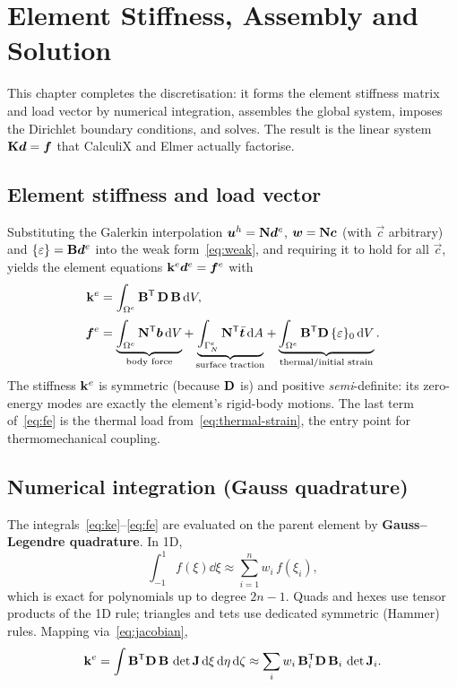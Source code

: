 \chapter{Element Stiffness, Assembly and Solution}
\label{ch:elements-assembly}

This chapter completes the discretisation: it forms the element stiffness
matrix and load vector by numerical integration, assembles the global
system, imposes the Dirichlet boundary conditions, and solves. The result
is the linear system $\mathbf{K}\bm{d}=\bm{f}$ that CalculiX and Elmer actually
factorise.

\section{Element stiffness and load vector}

Substituting the Galerkin interpolation $\bm{u}^h=\mathbf{N}\bm{d}^{e}$,
$\bm{w}=\mathbf{N}\bm{c}$ (with $\vec c$ arbitrary) and $\{\varepsilon\}=\mathbf{B}\bm{d}^{e}$ into
the weak form~\eqref{eq:weak}, and requiring it to hold for all $\vec c$,
yields the element equations $\mathbf{k}^{e}\bm{d}^{e}=\bm{f}^e$ with
\begin{align}
  \mathbf{k}^{e} &= \int_{\Omega^e}\mathbf{B}^{\mathsf{T}}\,\mathbf{D}\,\mathbf{B}\,\mathrm{d} V,
  \label{eq:ke}\\[2pt]
  \bm{f}^e &= \underbrace{\int_{\Omega^e}\mathbf{N}^{\mathsf{T}}\bm{b}\,\mathrm{d} V}_{\text{body force}}
   + \underbrace{\int_{\Gamma^e_N}\mathbf{N}^{\mathsf{T}}\bar{\bm{t}}\,\mathrm{d} A}_{\text{surface traction}}
   + \underbrace{\int_{\Omega^e}\mathbf{B}^{\mathsf{T}}\mathbf{D}\,\{\varepsilon\}_0\,\mathrm{d} V}_{\text{thermal/initial strain}} .
  \label{eq:fe}
\end{align}
The stiffness $\mathbf{k}^{e}$ is symmetric (because $\mathbf{D}$ is) and positive
\emph{semi}-definite: its zero-energy modes are exactly the element's
rigid-body motions. The last term of~\eqref{eq:fe} is the thermal load
from~\eqref{eq:thermal-strain}, the entry point for thermomechanical
coupling.

\section{Numerical integration (Gauss quadrature)}

The integrals~\eqref{eq:ke}--\eqref{eq:fe} are evaluated on the parent
element by \textbf{Gauss--Legendre quadrature}. In 1D,
\begin{equation}
  \int_{-1}^{1} f(\xi)\dd\xi \approx \sum_{i=1}^{n} w_i\,f(\xi_i),
\end{equation}
which is exact for polynomials up to degree $2n-1$. Quads and hexes use
tensor products of the 1D rule; triangles and tets use dedicated
symmetric (Hammer) rules. Mapping via~\eqref{eq:jacobian},
\begin{equation}
  \mathbf{k}^{e} = \int \mathbf{B}^{\mathsf{T}}\mathbf{D}\,\mathbf{B}\,\det\mathbf{J}\,\mathrm{d}\xi\,\mathrm{d}\eta\,\mathrm{d}\zeta
      \approx \sum_{i} w_i\,\mathbf{B}_i^{\mathsf{T}}\mathbf{D}\,\mathbf{B}_i\,\det\mathbf{J}_i .
\end{equation}

